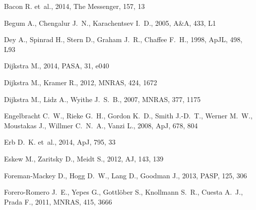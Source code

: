 \documentclass[a4,useAMS,usenatbib,usegraphicx]{mn2e}
\newcommand{\apj}{ApJ}
\newcommand{\pasa}{PASA}
\newcommand{\apjl}{ApJL}
\newcommand{\aj}{AJ}
\newcommand{\mnras}{MNRAS}
\newcommand{\aap}{A\&A}
\newcommand{\pasp}{PASP}
\begin{document}

%
\begin{thebibliography}{}

{Bacon} R.  et~al., 2014, The Messenger, 157, 13

{Begum} A.,  {Chengalur} J.~N.,    {Karachentsev} I.~D.,  2005, \aap, 433, L1

{Dey} A.,  {Spinrad} H.,  {Stern} D.,  {Graham} J.~R.,    {Chaffee} F.~H.,
  1998, \apjl, 498, L93

{Dijkstra} M.,  2014, \pasa, 31, e040

{Dijkstra} M.,  {Kramer} R.,  2012, \mnras, 424, 1672

{Dijkstra} M.,  {Lidz} A.,    {Wyithe} J.~S.~B.,  2007, \mnras, 377, 1175

{Engelbracht} C.~W.,  {Rieke} G.~H.,  {Gordon} K.~D.,  {Smith} J.-D.~T.,
  {Werner} M.~W.,  {Moustakas} J.,  {Willmer} C.~N.~A.,    {Vanzi} L.,  2008,
  \apj, 678, 804

{Erb} D.~K.  et~al., 2014, \apj, 795, 33

{Eskew} M.,  {Zaritsky} D.,    {Meidt} S.,  2012, \aj, 143, 139

{Foreman-Mackey} D.,  {Hogg} D.~W.,  {Lang} D.,    {Goodman} J.,  2013, \pasp,
  125, 306

{Forero-Romero} J.~E.,  {Yepes} G.,  {Gottl{\"o}ber} S.,  {Knollmann} S.~R.,
  {Cuesta} A.~J.,    {Prada} F.,  2011, \mnras, 415, 3666


\end{thebibliography}
\end{document}
